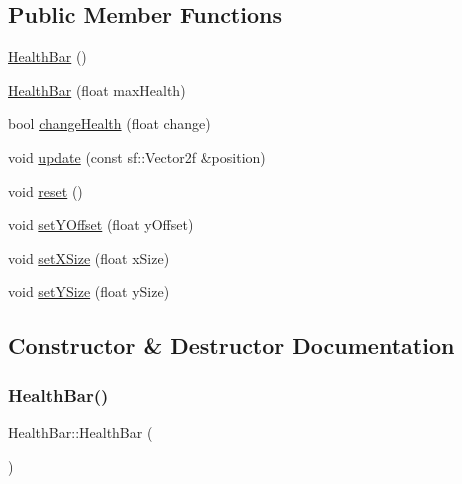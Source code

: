 \subsection*{Public Member Functions}
\begin{DoxyCompactItemize}
\item 
\hyperlink{class_health_bar_a05f694deecdc0399d9c5fb230493df05}{Health\+Bar} ()
\item 
\hyperlink{class_health_bar_a410af6573cf36cc0bc1a637b12f91572}{Health\+Bar} (float max\+Health)
\item 
bool \hyperlink{class_health_bar_a4e19dbe3bf281bcb0849096ce124ae5a}{change\+Health} (float change)
\item 
void \hyperlink{class_health_bar_a07c96f51c5742055c496f1dcc5959402}{update} (const sf\+::\+Vector2f \&position)
\item 
void \hyperlink{class_health_bar_a3b7bafeb8bcc5a58d3eb2756e2542e77}{reset} ()
\item 
void \hyperlink{class_health_bar_a625701fd387910d769905ebd1a0f41a4}{set\+Y\+Offset} (float y\+Offset)
\item 
void \hyperlink{class_health_bar_a161a9325d1bddd74fd13665ad12c979a}{set\+X\+Size} (float x\+Size)
\item 
void \hyperlink{class_health_bar_aaf0195e315de02546542962e17985126}{set\+Y\+Size} (float y\+Size)
\end{DoxyCompactItemize}


\subsection{Constructor \& Destructor Documentation}
\mbox{\label{class_health_bar_a05f694deecdc0399d9c5fb230493df05}} 
\subsubsection{\texorpdfstring{Health\+Bar()}{HealthBar()}\hspace{0.1cm}{\footnotesize\ttfamily [1/2]}}
{\footnotesize\ttfamily Health\+Bar\+::\+Health\+Bar (\begin{DoxyParamCaption}{ }\end{DoxyParamCaption})}

\mbox{\label{class_health_bar_a410af6573cf36cc0bc1a637b12f91572}} 
